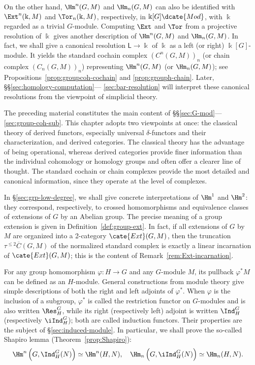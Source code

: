 On the other hand, $\Hm^n(G,M)$ and $\Hm_n(G,M)$ can also be identified with
$\Ext^n(\Bbbk,M)$ and $\Tor_n(\Bbbk,M)$, respectively, in
$\Bbbk[G]\dcate{Mod}$, with $\Bbbk$ regarded as a trivial $G$-module.
Computing $\Ext$ and $\Tor$ from a projective resolution of $\Bbbk$ gives
another description of $\Hm^n(G,M)$ and $\Hm_n(G,M)$. In fact, we shall give
a canonical resolution $\mathsf{L}\to\Bbbk$ of $\Bbbk$ as a left (or right)
$\Bbbk[G]$-module. It yields the standard cochain complex
$(C^n(G,M))_n$ (or chain complex $(C_n(G,M))_n$) representing $\Hm^n(G,M)$
(or $\Hm_n(G,M)$); see Propositions~\ref{prop:groupcoh-cochain} and
\ref{prop:grouph-chain}. Later, \S\S\ref{sec:homology-computation}---
\ref{sec:bar-resolution} will interpret these canonical resolutions from the
viewpoint of simplicial theory.

The preceding material constitutes the main content of
\S\S\ref{sec:G-mod}---\ref{sec:group-coh-sub}. This chapter adopts two
viewpoints at once: the classical theory of derived functors, especially
universal $\delta$-functors and their characterization, and derived categories.
The classical theory has the advantage of being operational, whereas derived
categories provide finer information than the individual cohomology or
homology groups and often offer a clearer line of thought. The standard
cochain or chain complexes provide the most detailed and canonical
information, since they operate at the level of complexes.

In \S\ref{sec:grp-low-degree}, we shall give concrete interpretations of
$\Hm^1$ and $\Hm^2$: they correspond, respectively, to crossed homomorphisms
and equivalence classes of extensions of $G$ by an Abelian group. The precise
meaning of a group extension is given in Definition~\ref{def:group-ext}. In
fact, if all extensions of $G$ by $M$ are organized into a 2-category
$\cate{Ext}(G,M)$, then the truncation
$\tau^{\leq2}\overline{C}(G,M)$ of the normalized standard complex is exactly
a linear incarnation of $\cate{Ext}(G,M)$; this is the content of
Remark~\ref{rem:Ext-incarnation}.

For any group homomorphism $\varphi:H\to G$ and any $G$-module $M$, its
pullback $\varphi^*M$ can be defined as an $H$-module. General constructions
from module theory give simple descriptions of both the right and left
adjoints of $\varphi^*$. When $\varphi$ is the inclusion of a subgroup,
$\varphi^*$ is called the restriction functor on $G$-modules and is also
written $\Res^G_H$, while its right (respectively left) adjoint is written
$\Ind^G_H$ (respectively $\iInd^G_H$); both are called induction functors.
Their properties are the subject of \S\ref{sec:induced-module}. In particular,
we shall prove the so-called Shapiro lemma (Theorem~\ref{prop:Shapiro}):
\[ \Hm^n\left(G, \Ind^G_H(N)\right) \simeq \Hm^n(H, N), \quad \Hm_n\left(G, \iInd^G_H(N)\right) \simeq \Hm_n(H, N). \]

